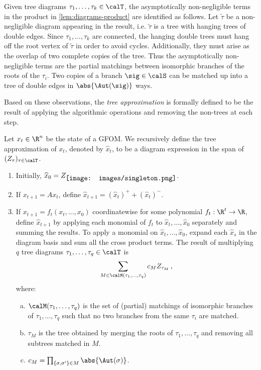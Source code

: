 \documentclass[12pt]{article}
\newcommand{\smallrootpic}{\vcenter{\hbox{\texttt{[image: images/singleton.png]}}}}
\begin{document}
Given tree diagrams $\tau_1, \dots, \tau_k \in \calT$, the asymptotically
non-negligible terms in the product in \cref{lem:diagrams-product} are identified as follows.
Let $\widetilde{\tau}$ be a non-negligible diagram appearing in the result,
i.e. $\widetilde{\tau}$ is a tree with hanging trees of double edges.
Since $\tau_1, \dots, \tau_k$ are connected,
the hanging double trees must hang off the root vertex of $\widetilde{\tau}$
in order to avoid cycles.
Additionally, they must arise as the overlap of two complete copies of the tree.
Thus the asymptotically non-negligible terms are the partial
matchings between isomorphic branches of the roots of the $\tau_i$.
Two copies of a branch $\sig \in \calS$ can be matched up into a tree
of double edges in $\abs{\Aut(\sig)}$ ways.

Based on these observations, the \textit{tree approximation} is formally
defined to be the result of applying the algorithmic operations and removing the non-trees at each step.

\begin{definition}
\label{def:asymptotic-state-explicit}
    Let $x_t\in\R^n$ be the state of a GFOM. We recursively define the tree approximation of $x_t$, denoted by $\widehat{x}_t$, to be a diagram expression in the span of $(Z_\tau)_{\tau \in \calT}$.
    \begin{enumerate}
        \item Initially, $\widehat{x}_0 = Z_{\smallrootpic}$.
        \item If $x_{t+1}=Ax_t$, define $\widehat{x}_{t+1} = (\widehat{x}_t)^+ + (\widehat{x}_t)^-$.
        \item If $x_{t+1}=f_t(x_t, \dots, x_0)$ coordinatewise for some polynomial $f_t:\R^t\to\R$, define
        $\widehat{x}_{t+1}$ by applying each monomial of $f_t$ to $\widehat{x}_t,\ldots,\widehat{x}_0$ separately and summing the results. To apply a monomial on $\widehat{x}_t, \dots, \widehat{x}_0$, expand each $\widehat{x}_s$ in the diagram basis and sum all the cross product terms. The result of multiplying $q$ tree diagrams $\tau_1, \dots, \tau_q \in \calT$ is
        \[\sum_{M \in \calM(\tau_1, \dots, \tau_q)} c_M Z_{\tau_M}\,,\]
        where:
        \begin{enumerate}[(a)]
            \item $\calM(\tau_1, \dots, \tau_q)$ is the set of (partial) matchings
            of isomorphic branches of $\tau_1, \dots, \tau_q$ such that no two branches from the same $\tau_i$ are matched.
            \item $\tau_M$ is the tree obtained by merging the roots of $\tau_1, \dots, \tau_q$ and removing all subtrees matched in $M$.
            \item $c_M = \prod_{\{\sigma, \sigma'\} \in M} \abs{\Aut(\sigma)}$.
        \end{enumerate}
    \end{enumerate}
\end{definition}
\end{document}
